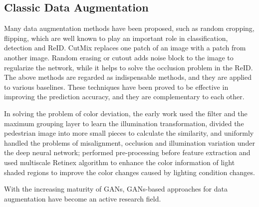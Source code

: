 \documentclass[10pt,twocolumn,letterpaper]{article}
\begin{document}
\subsection{Classic Data Augmentation}
Many data augmentation\cite{krizhevsky2012imagenet} methods have been proposed, such as random cropping\cite{krizhevsky2012imagenet}, flipping\cite{simonyan2014very}, which are well known to play an important role in classification, detection  and ReID. CutMix\cite{yun2019cutmix} replaces one patch
of an image with a patch from another image. Random erasing or cutout\cite{zhong2020random,devries2017improved} adds noise block to the image to regularize the network, while it helps to solve the occlusion problem in the ReID. The above methods are regarded as indispensable methods, and they are applied to various baselines\cite{luo2019bag,he2020fastreid,zheng2020vehiclenet,zheng2018discriminatively}. These techniques have been proved to be effective in improving the prediction accuracy, and they are complementary to each other\cite{luo2019bag}.

In solving the problem of color deviation, the early work\cite{li2014deepreid} used the filter and the maximum grouping layer to learn the illumination transformation, divided the pedestrian image into more small pieces to calculate the similarity, and uniformly handled the problems of misalignment, occlusion and illumination variation under the deep neural network; \cite{liao2015person} performed pre-processing before feature extraction and used multiscale Retinex algorithm to enhance the color information of light shaded regions to improve the color changes caused by lighting condition changes. 

With the increasing maturity of GANs, GANs-based approaches for data augmentation have become an active research field.
\end{document}
